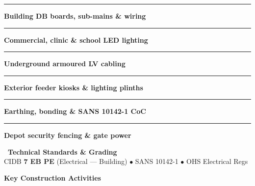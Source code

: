 \documentclass[a4paper,11pt]{article}
\begin{document}
\begin{minipage}[t]{0.34\textwidth}
    \vspace{0pt}
    \begin{tcolorbox}[
        enhanced, colback=mhoffwhite, colframe=mhnavy, boxrule=0.9pt, arc=4pt,
        title={\bfseries\color{white}\faBolt\ Scope of Work},
        colbacktitle=mhnavy, left=7pt, right=7pt, top=5pt, bottom=5pt, drop shadow=black!5
    ]
        \fontsize{7.8pt}{10.8pt}\selectfont
        \textcolor{mhnavy}{\rule{3.5pt}{3.5pt}}\hspace{4pt}\textbf{Building DB boards, sub-mains \& wiring}\\
        \textcolor{mhnavy}{\rule{3.5pt}{3.5pt}}\hspace{4pt}\textbf{Commercial, clinic \& school LED lighting}\\
        \textcolor{mhnavy}{\rule{3.5pt}{3.5pt}}\hspace{4pt}\textbf{Underground armoured LV cabling}\\
        \textcolor{mhnavy}{\rule{3.5pt}{3.5pt}}\hspace{4pt}\textbf{Exterior feeder kiosks \& lighting plinths}\\
        \textcolor{mhnavy}{\rule{3.5pt}{3.5pt}}\hspace{4pt}\textbf{Earthing, bonding \& SANS 10142-1 CoC}\\
        \textcolor{mhnavy}{\rule{3.5pt}{3.5pt}}\hspace{4pt}\textbf{Depot security fencing \& gate power}
    \end{tcolorbox}

    \vspace{0.12cm}

    \begin{tcolorbox}[
        enhanced, colback=white, colframe=mhlightgray, boxrule=0.8pt, arc=4pt,
        left=6pt, right=6pt, top=5pt, bottom=5pt, drop shadow=black!3
    ]
        {\fontsize{7.5pt}{9.6pt}\selectfont\bfseries\color{mhnavy}\faCheckDouble\ Technical Standards \& Grading}\\[2pt]
        {\fontsize{7.3pt}{9.4pt}\selectfont\color{mhtextmuted}
        CIDB \textbf{7 EB PE} (Electrical --- Building) $\bullet$ SANS 10142-1 $\bullet$ OHS Electrical Regs}
    \end{tcolorbox}
\end{minipage}

\vfill

{\large\bfseries\color{mhnavy} Key Construction Activities}
\vspace{0.10cm}
\end{document}
